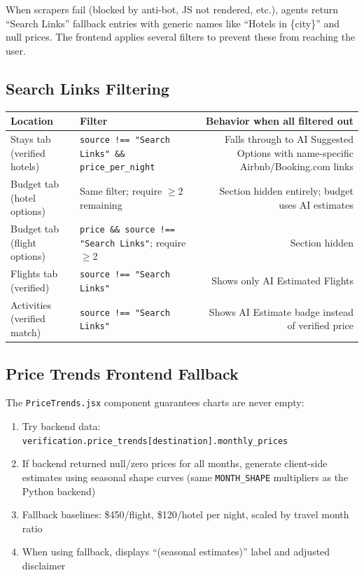 \documentclass[11pt,a4paper]{article}
\begin{document}
When scrapers fail (blocked by anti-bot, JS not rendered, etc.), agents return ``Search Links'' fallback entries with generic names like ``Hotels in \{city\}'' and null prices. The frontend applies several filters to prevent these from reaching the user.

\subsection{Search Links Filtering}

{\small
\begin{tabularx}{\textwidth}{@{}L{2.6cm}L{4cm}R@{}}
\toprule
\textbf{Location} & \textbf{Filter} & \textbf{Behavior when all filtered out} \\
\midrule
Stays tab (verified hotels) & \texttt{source !== "Search Links" \&\& price\_per\_night} & Falls through to AI Suggested Options with name-specific Airbnb/Booking.com links \\[4pt]
Budget tab (hotel options) & Same filter; require $\geq$2 remaining & Section hidden entirely; budget uses AI estimates \\[4pt]
Budget tab (flight options) & \texttt{price \&\& source !== "Search Links"}; require $\geq$2 & Section hidden \\[4pt]
Flights tab (verified) & \texttt{source !== "Search Links"} & Shows only AI Estimated Flights \\[4pt]
Activities (verified match) & \texttt{source !== "Search Links"} & Shows AI Estimate badge instead of verified price \\
\bottomrule
\end{tabularx}}

\subsection{Price Trends Frontend Fallback}

The \texttt{PriceTrends.jsx} component guarantees charts are never empty:

\begin{enumerate}
\item Try backend data: \texttt{verification.price\_trends[destination].monthly\_prices}
\item If backend returned null/zero prices for all months, generate client-side estimates using seasonal shape curves (same \texttt{MONTH\_SHAPE} multipliers as the Python backend)
\item Fallback baselines: \$450/flight, \$120/hotel per night, scaled by travel month ratio
\item When using fallback, displays ``(seasonal estimates)'' label and adjusted disclaimer
\end{enumerate}
\end{document}
